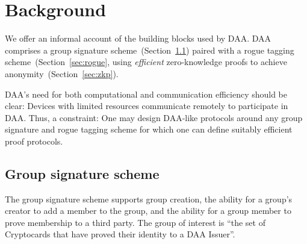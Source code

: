 \section{Background}

\newcommand{\QR}{\mathrm{QR}}
\newcommand{\defeq}{\mathrel{:=}}
\newcommand{\iseq}{\mathrel{\overset{\mathrm{?}}{=}}}
\newcommand{\secref}[1]{Section~\ref{sec:#1}}
\newcommand{\seclabel}[1]{\label{sec:#1}}

\begin{comment}
	\emph{PDS:}
	DAA as a combination of building blocks.
	Why DAA is cool.
	Hilight all the stuff you need to understand in order to understand DAA with words and no math formulae.
\end{comment}

We offer an informal account of the building blocks used by DAA.
DAA comprises a group signature scheme~(\secref{cl}) paired with a rogue tagging scheme~(\secref{rogue}, using \emph{efficient} zero-knowledge proofs to achieve anonymity~(\secref{zkp}).

DAA's need for both computational and communication efficiency should be clear:
Devices with limited resources communicate remotely to participate in DAA.
Thus, a constraint: One may design DAA-like protocols around any group
signature and rogue tagging scheme for which one can define suitably efficient
proof protocols.

\subsection{Group signature scheme}\seclabel{cl}

The group signature scheme supports group creation,
the ability for a group's creator to add a member to the group,
and the ability for a group member to prove membership to a third party.
The group of interest is ``the set of Cryptocards that have proved
their identity to a DAA Issuer''.

